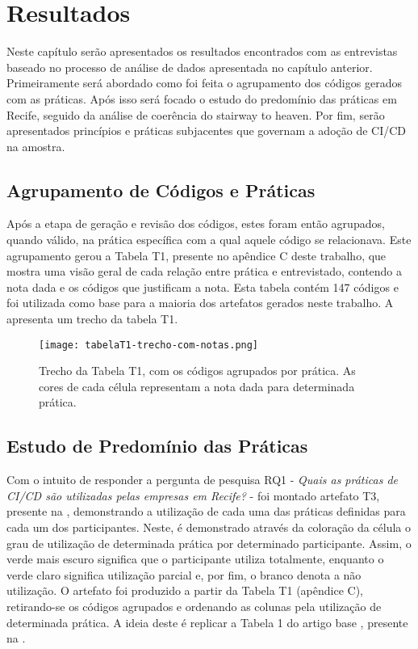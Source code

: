 
\chapter{Resultados}

Neste capítulo serão apresentados os resultados encontrados com as entrevistas baseado no processo de análise de dados apresentada no capítulo anterior. Primeiramente será abordado como foi feita o agrupamento dos códigos gerados com as práticas. Após isso será focado o estudo do predomínio das práticas em Recife, seguido da análise de coerência do stairway to heaven. Por fim, serão apresentados princípios e práticas subjacentes que governam a adoção de CI/CD na amostra.

\section{Agrupamento de Códigos e Práticas}

Após a etapa de geração e revisão dos códigos, estes foram então agrupados, quando válido, na prática específica com a qual aquele código se relacionava. Este agrupamento gerou a Tabela T1, presente no apêndice C deste trabalho, que mostra uma visão geral de cada relação entre prática e entrevistado, contendo a nota dada e os códigos que justificam a nota. Esta tabela contém 147 códigos e foi utilizada como base para a maioria dos artefatos gerados neste trabalho. A  apresenta um trecho da tabela T1.

\begin{figure}[ht]
    \begin{center}
    \texttt{[image: tabelaT1-trecho-com-notas.png]}
    \end{center}
    \caption[Trecho da Tabela T1]{
        Trecho da Tabela T1, com os códigos agrupados por prática. As cores de cada célula representam a nota dada para determinada prática.
}\label{trecho_tabela_t1}
\end{figure}


\section{Estudo de Predomínio das Práticas}

Com o intuito de responder a pergunta de pesquisa RQ1 - \emph{Quais as práticas de CI/CD são utilizadas pelas empresas em Recife?} - foi montado artefato T3, presente na , demonstrando a utilização de cada uma das práticas definidas para cada um dos participantes. Neste, é demonstrado através da coloração da célula o grau de utilização de determinada prática por determinado participante. Assim, o verde mais escuro significa que o participante utiliza totalmente, enquanto o verde claro significa utilização parcial e, por fim, o branco denota a não utilização. O artefato foi produzido a partir da Tabela T1 (apêndice C), retirando-se os códigos agrupados e ordenando as colunas pela utilização de determinada prática. A ideia deste é replicar a Tabela 1 do artigo base \cite{empiricalStudy2016}, presente na .

